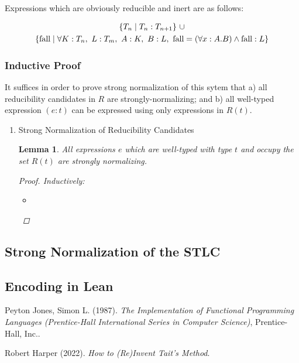 \documentclass[11pt]{article}
\newtheorem{lemma}[theorem]{Lemma}
\begin{document}
Expressions which are obviously reducible and inert are as follows:

\begin{gather*}
\{ T_{n} \mid T_{n} : T_{n + 1} \}\ \cup \notag \\
\{ \text{fall} \mid \forall K : T_{n},\ L : T_{m},\ A : K,\ B : L,\ \text{fall} = (\forall x : A.B) \land \text{fall} : L \}
\end{gather*}
\subsubsection{Inductive Proof}
\label{sec:orgbdea9f5}

It suffices in order to prove strong normalization of this sytem that a) all reducibility candidates in \(R\) are strongly-normalizing; and b) all well-typed expression \((e : t)\) can be expressed using only expressions in \(R(t)\).
\begin{enumerate}
\item Strong Normalization of Reducibility Candidates
\label{sec:org2a9ec50}

\begin{lemma}
All expressions $e$ which are well-typed with type $t$ and occupy the set $R(t)$ are strongly normalizing.
\begin{proof}
Inductively: \\
\begin{itemize}
\item 
\end{itemize}
\end{proof}
\end{lemma}
\end{enumerate}
\subsection{Strong Normalization of the STLC}
\label{sec:orge9fdcfb}
\subsection{Encoding in Lean}
\label{sec:org67adb2c}

\noindent
Peyton Jones, Simon L. (1987). \emph{The Implementation of Functional Programming Languages (Prentice-Hall International Series in Computer Science)}, Prentice-Hall, Inc..

\noindent
Robert Harper (2022). \emph{How to (Re)Invent Tait’s Method}.
\end{document}

